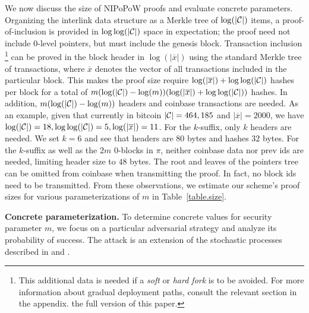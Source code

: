 We now discuss the size of NIPoPoW proofs and evaluate concrete parameters.
Organizing the interlink data structure as a Merkle tree of $\log(|\mathcal{C}|)$ items, a
proof-of-inclusion is provided in $\log \log(|\mathcal{C}|)$ space in expectation;
the proof need not include $0$-level pointers, but must include the genesis
block.
Transaction inclusion
\footnote{This additional data is needed if a \emph{soft} or \emph{hard fork} is
to be avoided. For more information about gradual deployment paths, consult the
relevant section in
\ifhasappendix
the appendix.
\else
the full version of this paper.
\fi}
can be proved in the block header in
$\log(|\overline x|)$ using the standard Merkle tree of transactions, where
$\overline x$ denotes the vector of all transactions included in the particular
block.
This makes the proof size require $\log(|\overline x|) +
\log\log(|\mathcal{C}|)$ hashes per block for a total of $m (\log(|\mathcal{C}|) -
\log(m))(\log(|\overline x|) + \log\log(|\mathcal{C}|))$ hashes. In addition, $m
(\log(|\mathcal{C}|) - \log(m))$ headers and coinbase transactions are needed. As an
example, given that currently in bitcoin $|\mathcal{C}| = 464,185$ and $|\overline x|
= 2000$, we have $\log(|\mathcal{C}|) = 18, \log\log(|\mathcal{C}|) = 5, \log(|\overline
x|) = 11$. For the $k$-suffix, only $k$ headers are needed. We set $k = 6$ and
see that headers are $80$ bytes and hashes $32$ bytes. For the $k$-suffix as
well as the $2m$ $0$-blocks in $\pi$, neither coinbase data nor prev ids are
needed, limiting header size to $48$ bytes. The root and leaves of the pointers
tree can be omitted from coinbase when transmitting the proof. In fact, no block
ids need to be transmitted. From these observations, we estimate our scheme's
proof sizes for various parameterizations of $m$ in Table~\ref{table.size}.

\noindent
\textbf{Concrete parameterization.}
To determine concrete values for security parameter $m$, we focus on a
particular adversarial strategy and analyze its probability of success.
The attack is an extension of the stochastic processes described in
\cite{bitcoin} and \cite{rosenfeld}.

